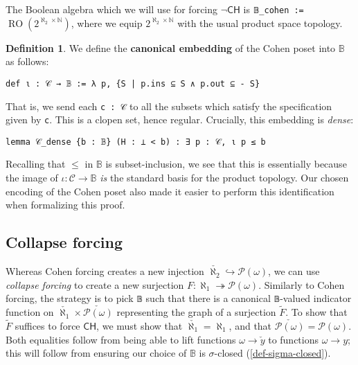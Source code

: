 \documentclass[sigplan,10pt,review, anonymous]{acmart}
\newcommand{\B}{\mathbb{B}}
\newcommand{\lil}{\lstinline}
\newcommand{\CH}{\mathsf{CH}}
\theoremstyle{definition}
\newtheorem{defn}{Definition}[section]
\begin{document}
The Boolean algebra which we will use for forcing $\neg\mathsf{CH}$ is \lil{𝔹_cohen := } $\operatorname{RO}(2^{\aleph_2 \times \mathbb{N}})$, where we equip $2^{\aleph_2 \times \mathbb{N}}$ with the usual product space topology.

\begin{defn}
  We define the \textbf{canonical embedding} of the Cohen poset into $\B$ as follows:
  \begin{lstlisting}
def ι : 𝒞 → 𝔹 := λ p, {S | p.ins ⊆ S ∧ p.out ⊆ - S}
\end{lstlisting}
\end{defn}
That is, we send each \lil{c : 𝒞} to all the subsets which satisfy the specification given by \lil{c}. This is a clopen set, hence regular. Crucially, this embedding is \emph{dense}:
\begin{lstlisting}
lemma 𝒞_dense {b : 𝔹} (H : ⊥ < b) : ∃ p : 𝒞, ι p ≤ b
\end{lstlisting}
Recalling that $\leq$ in $\B$ is subset-inclusion, we see that this is essentially because the image of $\iota : \mathcal{C} \to \B$ \emph{is} the standard basis for the product topology. Our chosen encoding of the Cohen poset also made it easier to perform this identification when formalizing this proof.

\subsection{Collapse forcing} \label{subsection:collapse}

Whereas Cohen forcing creates a new injection \(\check{\aleph_2} \hookrightarrow \mathcal{P}(\omega)\), we can use \emph{collapse forcing} to create a new surjection \(F : \aleph_1 \twoheadrightarrow \mathcal{P}(\omega)\). Similarly to Cohen forcing, the strategy is to pick \lil{𝔹} such that there is a canonical \lil{𝔹}-valued indicator function on \(\check{\aleph_1} \times \check{\mathcal{P}(\omega)}\) representing the graph of a surjection \(\widetilde{F}\). To show that \(\widetilde{F}\) suffices to force \(\CH\), we must show that \(\check{\aleph_1} = \aleph_1\), and that \(\check{\mathcal{P}(\omega)} = \mathcal{P}(\omega).\) Both equalities follow from being able to lift functions \(\omega \to \check{y}\) to functions \(\omega \to y\); this will follow from ensuring our choice of \(\mathbb{B}\) is \(\sigma\)-closed (\ref{def-sigma-closed}).
\end{document}
